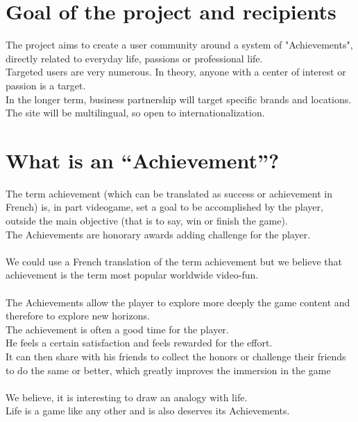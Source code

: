 \documentclass{life-fr}
\begin{document}
\section{Goal of the project and recipients}

The project aims to create a user community around a system of "Achievements", directly related to everyday life, passions or professional life.\\

Targeted users are very numerous. In theory, anyone with a center of interest or passion is a target.\\

In the longer term, business partnership will target specific brands and locations.\\

The site will be multilingual, so open to internationalization.

\newpage

\section{What is an ``Achievement''?}

The term achievement (which can be translated as success or achievement in French) is, in part videogame, set a goal to be accomplished by the player, outside the main objective (that is to say, win or finish the game).\\
The Achievements are honorary awards adding challenge for the player.\\
\\
We could use a French translation of the term achievement but we believe that achievement is the term most popular worldwide video-fun.\\
\\
The Achievements allow the player to explore more deeply the game content and therefore to explore new horizons.\\
The achievement is often a good time for the player.\\
He feels a certain satisfaction and feels rewarded for the effort.\\
It can then share with his friends to collect the honors or challenge their friends to do the same or better, which greatly improves the immersion in the game \\
\\
We believe, it is interesting to draw an analogy with life.\\
Life is a game like any other and is also deserves its Achievements.\\
\end{document}
